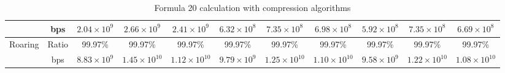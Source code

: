 \begin{table}[h]
{\begin{tabular}{|c|c|c|c|c|c|c|c|c|c|c|}
\cline{2-11}
& bps & $2.04 \times 10^{9}$ & $2.66 \times 10^{9}$ & $2.41 \times 10^{9}$ & $6.32 \times 10^{8}$ & $7.35 \times 10^{8}$ & $6.98 \times 10^{8}$ & $5.92 \times 10^{8}$ & $7.35 \times 10^{8}$ & $6.69 \times 10^{8}$ \\
\hline
\multirow{2}{*}{Roaring} & Ratio & 99.97\% & 99.97\% & 99.97\% & 99.97\% & 99.97\% & 99.97\% & 99.97\% & 99.97\% & 99.97\% \\
\cline{2-11}
& bps & $8.83 \times 10^{9}$ & $1.45 \times 10^{10}$ & $1.12 \times 10^{10}$ & $9.79 \times 10^{9}$ & $1.25 \times 10^{10}$ & $1.10 \times 10^{10}$ & $9.58 \times 10^{9}$ & $1.22 \times 10^{10}$ & $1.08 \times 10^{10}$ \\
\hline
\end{tabular}
}
\caption{Formula 20 calculation with compression algorithms}
\label{tbl:formulacompress20}
\end{table}


